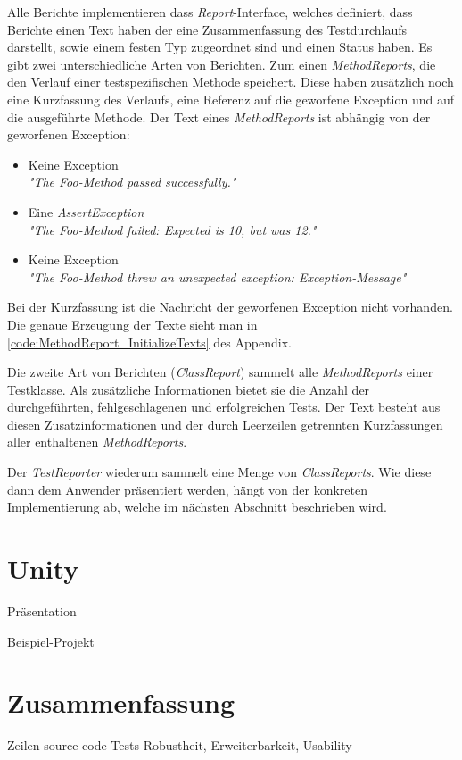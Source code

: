 Alle Berichte implementieren dass \textit{Report}-Interface, welches definiert, dass Berichte einen Text haben der eine Zusammenfassung des Testdurchlaufs darstellt, sowie einem festen Typ zugeordnet sind und einen Status haben. Es gibt zwei unterschiedliche Arten von Berichten. Zum einen \textit{MethodReports}, die den Verlauf einer testspezifischen Methode speichert. Diese haben zusätzlich noch eine Kurzfassung des Verlaufs, eine Referenz auf die geworfene Exception und auf die ausgeführte Methode. Der Text eines \textit{MethodReports} ist abhängig von der geworfenen Exception:
\begin{itemize}
\item Keine Exception\\
\textit{"The Foo-Method passed successfully."}
\item Eine \textit{AssertException}\\
\textit{"The Foo-Method failed: Expected is 10, but was 12."}
\item Keine Exception\\
\textit{"The Foo-Method threw an unexpected exception: Exception-Message"}
\end{itemize}
Bei der Kurzfassung ist die Nachricht der geworfenen Exception nicht vorhanden. Die genaue Erzeugung der Texte sieht man in \autoref{code:MethodReport_InitializeTexts}  des Appendix.

Die zweite Art von Berichten (\textit{ClassReport}) sammelt alle \textit{MethodReports} einer Testklasse. Als zusätzliche Informationen bietet sie die Anzahl der durchgeführten, fehlgeschlagenen und erfolgreichen Tests. Der Text besteht aus diesen Zusatzinformationen und der durch Leerzeilen getrennten Kurzfassungen aller enthaltenen \textit{MethodReports}.

Der \textit{TestReporter} wiederum sammelt eine Menge von \textit{ClassReports}. Wie diese dann dem Anwender präsentiert werden, hängt von der konkreten Implementierung ab, welche im nächsten Abschnitt beschrieben wird.

\section{Unity}
\label{sec:Ergebnis_Unity}

Präsentation

Beispiel-Projekt

\section{Zusammenfassung}

Zeilen source code
Tests Robustheit, Erweiterbarkeit, Usability